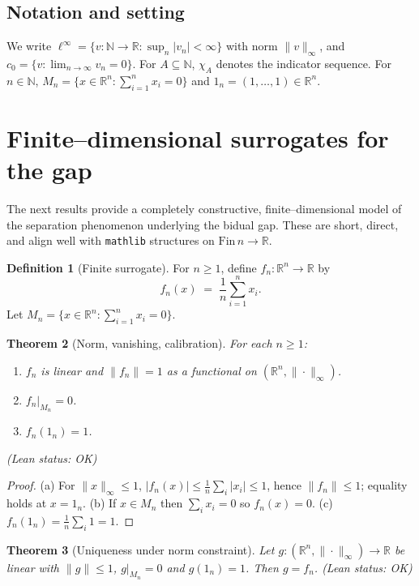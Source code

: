 \documentclass[11pt]{article}
\newtheorem{theorem}{Theorem}[section]
\theoremstyle{definition}
\newtheorem{definition}[theorem]{Definition}
\newcommand{\N}{\mathbb{N}}
\newcommand{\R}{\mathbb{R}}
\newcommand{\linf}{\ell^\infty}
\newcommand{\cnull}{c_0}
\newcommand{\leanok}{\textsf{\small (Lean status: OK)}}
\begin{document}
\subsection{Notation and setting}
We write $\linf=\{v:\N\to\R:\sup_n|v_n|<\infty\}$ with norm $\|v\|_\infty$, and
$\cnull=\{v:\lim_{n\to\infty} v_n=0\}$. For $A\subseteq\N$, $\chi_A$ denotes the indicator sequence.
For $n\in\N$, $M_n=\{x\in\R^n:\sum_{i=1}^n x_i=0\}$ and $1_n=(1,\dots,1)\in\R^n$.

\section{Finite--dimensional surrogates for the gap}\label{sec:finite}

The next results provide a completely constructive, finite--dimensional model of the
separation phenomenon underlying the bidual gap. These are short, direct, and align
well with \texttt{mathlib} structures on $\mathrm{Fin}\,n\to\R$.

\begin{definition}[Finite surrogate]
For $n\ge1$, define $f_n:\R^n\to\R$ by
\[
  f_n(x)\;=\;\frac1n\sum_{i=1}^n x_i.
\]
Let $M_n=\{x\in\R^n:\sum_{i=1}^n x_i=0\}$.
\end{definition}

\begin{theorem}[Norm, vanishing, calibration]\label{thm:fn-basics}
For each $n\ge1$:
\begin{enumerate}[label=\textup{(\alph*)}]
  \item $f_n$ is linear and $\|f_n\|=1$ as a functional on $(\R^n,\|\cdot\|_\infty)$.
  \item $f_n|_{M_n}=0$.
  \item $f_n(1_n)=1$.
\end{enumerate}
\leanok
\end{theorem}

\begin{proof}
(a) For $\|x\|_\infty\le1$, $|f_n(x)|\le \frac1n\sum_i |x_i|\le1$, hence $\|f_n\|\le1$;
equality holds at $x=1_n$. (b) If $x\in M_n$ then $\sum_i x_i=0$ so $f_n(x)=0$.
(c) $f_n(1_n)=\frac1n\sum_i 1 = 1$.
\end{proof}

\begin{theorem}[Uniqueness under norm constraint]\label{thm:uniqueness}
Let $g:(\R^n,\|\cdot\|_\infty)\to\R$ be linear with $\|g\|\le1$, $g|_{M_n}=0$ and $g(1_n)=1$.
Then $g=f_n$. \leanok
\end{theorem}
\end{document}
